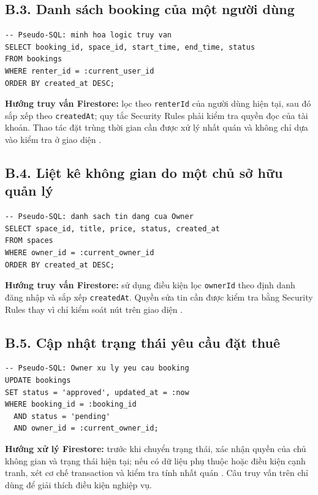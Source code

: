 \subsection*{B.3. Danh sách booking của một người dùng}
\begin{verbatim}
-- Pseudo-SQL: minh hoa logic truy van
SELECT booking_id, space_id, start_time, end_time, status
FROM bookings
WHERE renter_id = :current_user_id
ORDER BY created_at DESC;
\end{verbatim}
\noindent\textbf{Hướng truy vấn Firestore:} lọc theo \texttt{renterId} của người dùng hiện tại, sau đó sắp xếp theo \texttt{createdAt}; quy tắc Security Rules phải kiểm tra quyền đọc của tài khoản. Thao tác đặt trùng thời gian cần được xử lý nhất quán và không chỉ dựa vào kiểm tra ở giao diện \parencite{firebase_security,firebase_transaction}.

\subsection*{B.4. Liệt kê không gian do một chủ sở hữu quản lý}
\begin{verbatim}
-- Pseudo-SQL: danh sach tin dang cua Owner
SELECT space_id, title, price, status, created_at
FROM spaces
WHERE owner_id = :current_owner_id
ORDER BY created_at DESC;
\end{verbatim}
\noindent\textbf{Hướng truy vấn Firestore:} sử dụng điều kiện lọc \texttt{ownerId} theo định danh đăng nhập và sắp xếp \texttt{createdAt}. Quyền sửa tin cần được kiểm tra bằng Security Rules thay vì chỉ kiểm soát nút trên giao diện \parencite{firebase_security}.

\subsection*{B.5. Cập nhật trạng thái yêu cầu đặt thuê}
\begin{verbatim}
-- Pseudo-SQL: Owner xu ly yeu cau booking
UPDATE bookings
SET status = 'approved', updated_at = :now
WHERE booking_id = :booking_id
  AND status = 'pending'
  AND owner_id = :current_owner_id;
\end{verbatim}
\noindent\textbf{Hướng xử lý Firestore:} trước khi chuyển trạng thái, xác nhận quyền của chủ không gian và trạng thái hiện tại; nếu có dữ liệu phụ thuộc hoặc điều kiện cạnh tranh, xét cơ chế transaction và kiểm tra tính nhất quán \parencite{firebase_transaction,firebase_security}. Câu truy vấn trên chỉ dùng để giải thích điều kiện nghiệp vụ.

